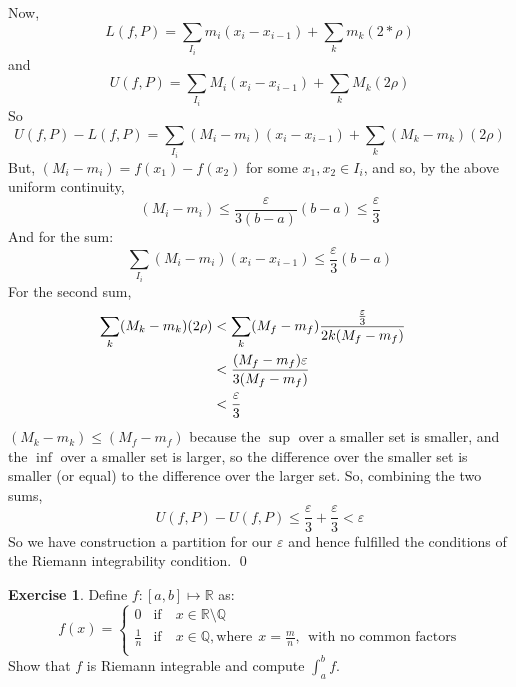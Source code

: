 \documentclass[11pt,oneside]{article}
\numberwithin{equation}{section}
\theoremstyle{definition}
\newtheorem{exercise}{Exercise}
\def\RR{\mathbb{R}}
\def\QQ{\mathbb{Q}}
\begin{document}
\begin{solution}
    Now,
    $$ L(f,P) = \sum \limits _ { I_i } m_i (x_i - x_{i-1}) + \sum \limits _k m_k (2 * \rho) $$
    and
    $$ U(f,P) = \sum \limits _ { I_i } M_i (x_i - x_{i-1}) + \sum \limits _k M_k (2 \rho) $$
    So
    $$ U(f,P) - L(f,P) = \sum \limits_{I_i} (M_i - m_i) ( x_i - x_{i-1}) + \sum \limits _k (M_k - m_k) (2 \rho) $$
    But, $ (M_i - m_i) = f(x_1) - f(x_2) $ for some $ x_1, x_2 \in I_i$, and so, by the above uniform continuity,
    $$
    (M_i - m_i) \leq \frac{\varepsilon}{3(b-a)} (b-a) \leq \frac{\varepsilon}{3}
    $$
    And for the sum:
    $$
    \sum \limits_{I_i} (M_i - m_i) (x_i - x_{i-1}) \leq \frac{\varepsilon}{3} (b -a)
    $$
    For the second sum,
    \begin{align*}
      \sum \limits _k (M_k - m_k) (2 \rho) & < \sum \limits _k (M_f - m_f) {\frac{\varepsilon}{3} \over 2k (M_f - m_f)}  & \\
      & < \frac{(M_f - m_f) \varepsilon}{3(M_f - m_f)} & \\
      & < \frac{\varepsilon}{3}  & \\
    \end{align*}
    $(M_k - m_k) \leq (M_f - m_f)$ because the $\sup$ over a smaller set is smaller, and the $\inf$ over a smaller set is larger,
    so the difference over the smaller set is smaller (or equal) to the difference over the larger set.
    So, combining the two sums,
    $$
    U(f, P) - U(f, P) \leq \frac{\varepsilon}{3} + \frac{\varepsilon}{3} < \varepsilon
    $$
    So we have construction a partition for our $\varepsilon$ and hence fulfilled the conditions of the
    Riemann integrability condition.  \qed
    
    
  
\end{solution}

\begin{exercise}
  Define $f : [a,b ] \mapsto \RR $ as:
  $$
  f(x) = \begin{cases}
    0 & \text{if} \quad x \in \RR \setminus \QQ \\
    \frac{1}{n} & \text{if} \quad x \in \QQ, \text{where}\ \  x = \frac{m}{n}, \ \ 
    \text{with no common factors} \\
  \end{cases}
  $$
  Show that $f$ is Riemann integrable and compute $\int _ {a} ^ {b} f$.  
\end{exercise}
\end{document}
